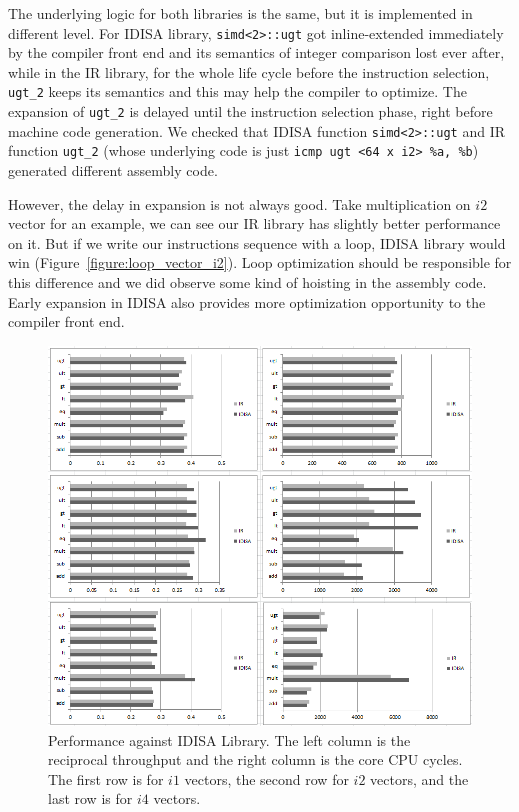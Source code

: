 The underlying logic for both libraries is the same, but it is implemented in different level. For IDISA library, {\tt simd<2>::ugt} got inline-extended immediately by the compiler front end and its semantics of integer comparison lost ever after, while in the IR library, for the whole life cycle before the instruction selection, {\tt ugt\_2} keeps its semantics and this may help the compiler to optimize. The expansion of {\tt ugt\_2} is delayed until the instruction selection phase, right before machine code generation. We checked that IDISA function {\tt simd<2>::ugt} and IR function {\tt ugt\_2} (whose underlying code is just \verb|icmp ugt <64 x i2> %a, %b|) generated different assembly code.

However, the delay in expansion is not always good. Take multiplication on $i2$ vector for an example, we can see our IR library has slightly better performance on it. But if we write our instructions sequence with a loop, IDISA library would win (Figure~\ref{figure:loop_vector_i2}). Loop optimization should be responsible for this difference and we did observe some kind of hoisting in the assembly code. Early expansion in IDISA also provides more optimization opportunity to the compiler front end.

\begin{figure}[ht!]
\centering
\includegraphics[width=140mm]{draw/vector_idisa_perf.png}
\caption[Performance Against IDISA Library]{Performance against IDISA Library. The left column is the reciprocal throughput and the right column is the core CPU cycles. The first row is for $i1$ vectors, the second row for $i2$ vectors, and the last row is for $i4$ vectors.}
\label{figure:vector_perf_idisa}
\end{figure}

